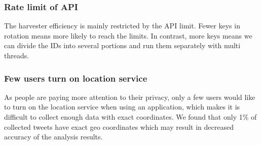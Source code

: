 \subsubsection{Rate limit of API}

The harvester efficiency is mainly restricted by the API limit. Fewer keys in rotation means more likely to reach the limits. In contrast, more keys means we can divide the IDs into several portions and run them separately with multi threads. 

\subsubsection{Few users turn on location service}
As people are paying more attention to their privacy, only a few users would like to turn on the location service when using an application, which makes it is difficult to collect enough data with exact coordinates. We found that only 1\% of collected tweets have exact geo coordinates which may result in decreased accuracy of the analysis results.
